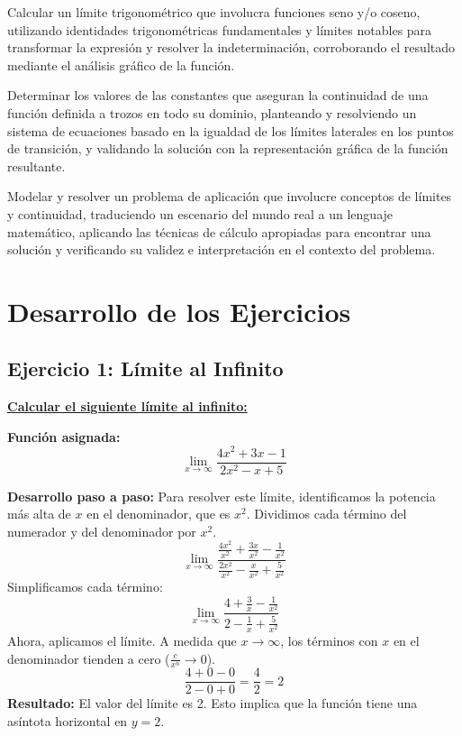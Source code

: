 \documentclass{article}
\begin{document}
Calcular un límite trigonométrico que involucra funciones seno y/o coseno, utilizando identidades trigonométricas fundamentales y límites notables para transformar la expresión y resolver la indeterminación, corroborando el resultado mediante el análisis gráfico de la función.

Determinar los valores de las constantes que aseguran la continuidad de una función definida a trozos en todo su dominio, planteando y resolviendo un sistema de ecuaciones basado en la igualdad de los límites laterales en los puntos de transición, y validando la solución con la representación gráfica de la función resultante.

Modelar y resolver un problema de aplicación que involucre conceptos de límites y continuidad, traduciendo un escenario del mundo real a un lenguaje matemático, aplicando las técnicas de cálculo apropiadas para encontrar una solución y verificando su validez e interpretación en el contexto del problema.

\newpage

\section*{Desarrollo de los Ejercicios}

\subsection*{Ejercicio 1: Límite al Infinito}
\underline{\textbf{Calcular el siguiente límite al infinito:}}

\textbf{Función asignada:}
\[ \lim_{x \to \infty} \frac{4x^2 + 3x - 1}{2x^2 - x + 5} \]

\textbf{Desarrollo paso a paso:}
Para resolver este límite, identificamos la potencia más alta de $x$ en el denominador, que es $x^2$. Dividimos cada término del numerador y del denominador por $x^2$.
\[ \lim_{x \to \infty} \frac{\frac{4x^2}{x^2} + \frac{3x}{x^2} - \frac{1}{x^2}}{\frac{2x^2}{x^2} - \frac{x}{x^2} + \frac{5}{x^2}} \]
Simplificamos cada término:
\[ \lim_{x \to \infty} \frac{4 + \frac{3}{x} - \frac{1}{x^2}}{2 - \frac{1}{x} + \frac{5}{x^2}} \]
Ahora, aplicamos el límite. A medida que $x \to \infty$, los términos con $x$ en el denominador tienden a cero ($\frac{c}{x^n} \to 0$).
\[ \frac{4 + 0 - 0}{2 - 0 + 0} = \frac{4}{2} = 2 \]
\textbf{Resultado:} El valor del límite es 2. Esto implica que la función tiene una asíntota horizontal en $y=2$.
\end{document}
